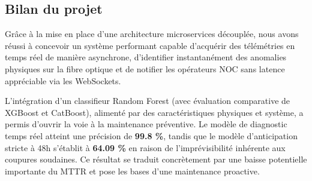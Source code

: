 \documentclass[11pt,a4paper]{article}
\begin{document}
\subsection{Bilan du projet}
Grâce à la mise en place d'une architecture microservices découplée, nous avons réussi à concevoir un système performant capable d'acquérir des télémétries en temps réel de manière asynchrone, d'identifier instantanément des anomalies physiques sur la fibre optique et de notifier les opérateurs NOC sans latence appréciable via les WebSockets. 

L'intégration d'un classifieur Random Forest (avec évaluation comparative de XGBoost et CatBoost), alimenté par des caractéristiques physiques et système, a permis d'ouvrir la voie à la maintenance préventive. Le modèle de diagnostic temps réel atteint une précision de \textbf{99.8 \%}, tandis que le modèle d'anticipation stricte à 48h s'établit à \textbf{64.09 \%} en raison de l'imprévisibilité inhérente aux coupures soudaines. Ce résultat se traduit concrètement par une baisse potentielle importante du MTTR et pose les bases d'une maintenance proactive.
\end{document}
